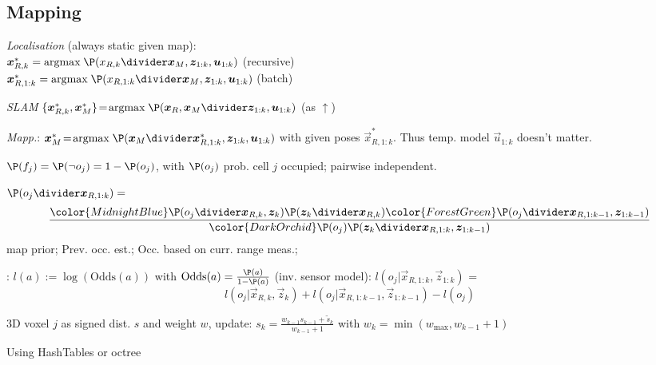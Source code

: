 \newpage
\subsection{Mapping}
 \textit{Localisation} {\scriptsize (always static given map)}:\\
$\vec{x}^*_{R, k} = \text{argmax}\; \P(x_{R, k} \divider \vec{x}_M, \vec{z}_{1 : k}, \vec{u}_{1 : k})$ (recursive)\\
$\vec{x}^*_{R, 1:k} = \text{argmax}\; \P(x_{R, 1:k} \divider \vec{x}_M, \vec{z}_{1 : k}, \vec{u}_{1 : k})$ (batch)

\textit{SLAM} $\{ \vec{x}^*_{R, k}, \vec{x}^*_M \} \! = \! \text{argmax}\; \P(\vec{x}_R, \vec{x}_M \divider \vec{z}_{1 : k}, \vec{u}_{1 : k})$ (as $\uparrow$)

\textit{Mapp.}: $\vec{x}_M^* \! = \! \text{argmax}\; \P(\vec{x}_M \divider \vec{x}^*_{R, 1:k}, \vec{z}_{1 : k}, \vec{u}_{1 : k})$ with given poses $\vec{x}^*_{R, 1:k}$.
Thus temp. model $\vec{u}_{1:k}$ doesn't matter.

 $\P(f_j) = \P(\neg o_j) = 1 - \P(o_j)$, with $\P(o_j)$ prob. cell $j$ occupied; pairwise independent.

 $\P(o_j \divider \vec{x}_{R, 1:k}) =$
\[
    \frac{
        {\color{MidnightBlue} \P(o_j \divider \vec{x}_{R, k}, \vec{z}_k)}
        \P(\vec{z}_k \divider \vec{x}_{R, k})
        {\color{ForestGreen} \P(o_j \divider \vec{x}_{R, 1 : k - 1}, \vec{z}_{1 : k - 1})}
    }{{\color{DarkOrchid} \P(o_j)} \P(\vec{z}_k \divider \vec{x}_{R, 1 : k}, \vec{z}_{1 : k - 1})}
\]
{\color{DarkOrchid} map prior}; {\color{ForestGreen} Prev. occ. est.}; {\color{MidnightBlue} Occ. based on curr. range meas.};

:
$l(a) := \log(\text{Odds}(a))$ with $\text{Odds}(a) = \frac{\P(a)}{1 - \P(a)}$ (inv. sensor model):
$l(o_j | \vec{x}_{R, 1 : k}, \vec{z}_{1 : k})$ =
\[
    l(o_j | \vec{x}_{R, k}, \vec{z}_k) + l(o_j | \vec{x}_{R, 1 : k - 1}, \vec{z}_{1 : k - 1}) - l(o_j)
\]

 3D voxel $j$ as signed dist. $s$ and weight $w$, update:
$\displaystyle s_k = \frac{w_{k - 1} s_{k - 1} + \tilde{s}_k}{w_{k - 1} + 1}$ with $w_k = \min(w_{\max}, w_{k - 1} + 1)$

 Using HashTables or octree
